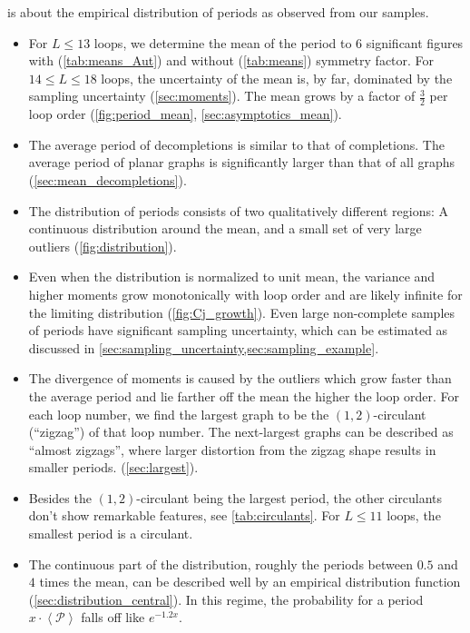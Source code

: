 \documentclass[11pt,a4paper]{article}
\newcommand{\period}{\mathcal P}
\renewcommand{\|}{\rule[-0.4ex]{0.2ex}{1.2em}}
\begin{document}
\noindent
{} is about the empirical distribution of periods as observed from our samples.
\begin{itemize}
	 \item For $L \leq 13$ loops, we determine the mean of the period to 6 significant figures with (\cref{tab:means_Aut}) and without (\cref{tab:means}) symmetry factor. For $14 \leq L \leq 18$ loops, the uncertainty of the mean is, by far, dominated by the sampling uncertainty (\cref{sec:moments}). The mean grows by a factor of $\frac 3 2$ per loop order (\cref{fig:period_mean}, \cref{sec:asymptotics_mean}).
	  \item The average period of decompletions is similar to that of completions. The average period of planar graphs is significantly larger than that of all graphs  (\cref{sec:mean_decompletions}).
	 \item The distribution of periods consists of two qualitatively different regions: A continuous distribution around the mean, and a small set of very large outliers (\cref{fig:distribution}).  
	 \item Even when the distribution is normalized to unit mean, the variance and higher moments   grow monotonically with loop order and are likely infinite for the limiting distribution (\cref{fig:Cj_growth}). Even large non-complete samples of periods have significant sampling uncertainty, which can be estimated as discussed in \cref{sec:sampling_uncertainty,sec:sampling_example}.
	 \item The divergence of moments is caused by the outliers  which grow faster than the average period and lie farther off the mean the higher the loop order. For each loop number, we find the largest graph to be the $(1,2)$-circulant (\enquote{zigzag}) of that loop number. The next-largest graphs can be described as \enquote{almost zigzags}, where larger distortion from the zigzag shape results in smaller periods. (\cref{sec:largest}).
	 \item Besides the $(1,2)$-circulant being the largest period, the other circulants don't show remarkable features, see \cref{tab:circulants}. For $L \leq 11$ loops, the smallest period is a circulant.
	 \item The continuous part of the distribution, roughly the periods between $0.5$ and $4$ times the mean, can be  described well by an empirical distribution function (\cref{sec:distribution_central}). In this regime, the probability for a period $x \cdot \left \langle \period \right \rangle $ falls off like $e^{-1.2 x}$.

\end{itemize}
\end{document}
